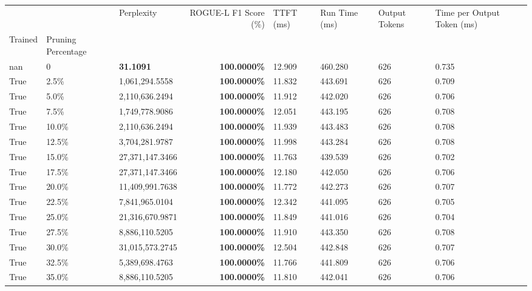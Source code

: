 \begin{table}[H]
\label{tab:evaluation-pipeline-5-trained}
\begin{tabular}{lllrllll}
\toprule
 &  & Perplexity & ROGUE-L F1 Score (\%) & TTFT (ms) & Run Time (ms) & Output Tokens & Time per Output Token (ms) \\
Trained & Pruning Percentage &  &  &  &  &  &  \\
\midrule
nan & 0 & \bfseries 31.1091 & \bfseries 100.0000\% & 12.909 & 460.280 & 626 & 0.735 \\
\cline{1-8}
True & 2.5\% & 1,061,294.5558 & \bfseries \color{red} 100.0000\% & 11.832 & 443.691 & 626 & 0.709 \\
\cline{1-8}
True & 5.0\% & 2,110,636.2494 & \bfseries \color{red} 100.0000\% & 11.912 & 442.020 & 626 & 0.706 \\
\cline{1-8}
True & 7.5\% & 1,749,778.9086 & \bfseries \color{red} 100.0000\% & 12.051 & 443.195 & 626 & 0.708 \\
\cline{1-8}
True & 10.0\% & 2,110,636.2494 & \bfseries \color{red} 100.0000\% & 11.939 & 443.483 & 626 & 0.708 \\
\cline{1-8}
True & 12.5\% & 3,704,281.9787 & \bfseries \color{red} 100.0000\% & 11.998 & 443.284 & 626 & 0.708 \\
\cline{1-8}
True & 15.0\% & 27,371,147.3466 & \bfseries \color{red} 100.0000\% & 11.763 & 439.539 & 626 & 0.702 \\
\cline{1-8}
True & 17.5\% & 27,371,147.3466 & \bfseries \color{red} 100.0000\% & 12.180 & 442.050 & 626 & 0.706 \\
\cline{1-8}
True & 20.0\% & 11,409,991.7638 & \bfseries \color{red} 100.0000\% & 11.772 & 442.273 & 626 & 0.707 \\
\cline{1-8}
True & 22.5\% & 7,841,965.0104 & \bfseries \color{red} 100.0000\% & 12.342 & 441.095 & 626 & 0.705 \\
\cline{1-8}
True & 25.0\% & 21,316,670.9871 & \bfseries \color{red} 100.0000\% & 11.849 & 441.016 & 626 & 0.704 \\
\cline{1-8}
True & 27.5\% & 8,886,110.5205 & \bfseries \color{red} 100.0000\% & 11.910 & 443.350 & 626 & 0.708 \\
\cline{1-8}
True & 30.0\% & 31,015,573.2745 & \bfseries \color{red} 100.0000\% & 12.504 & 442.848 & 626 & 0.707 \\
\cline{1-8}
True & 32.5\% & 5,389,698.4763 & \bfseries \color{red} 100.0000\% & 11.766 & 441.809 & 626 & 0.706 \\
\cline{1-8}
True & 35.0\% & 8,886,110.5205 & \bfseries \color{red} 100.0000\% & 11.810 & 442.041 & 626 & 0.706 \\

\end{tabular}
\end{table}
